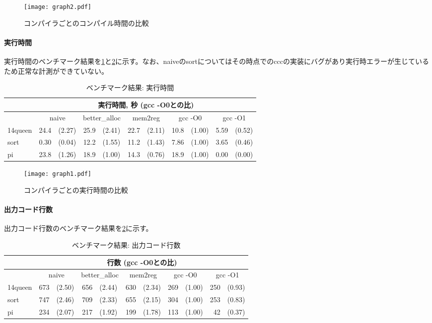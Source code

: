 \documentclass[../main.tex]{subfiles}
\begin{document}
\begin{figure}[h]
  \centering
  \texttt{[image: graph2.pdf]}
  \caption{コンパイラごとのコンパイル時間の比較}
  \label{ccc_bench_compile_graph}
\end{figure}

\clearpage
\paragraph{実行時間}

実行時間のベンチマーク結果を\cref{ccc_bench_run}と\cref{ccc_bench_run_graph}に示す。なお、naiveのsortについてはその時点でのcccの実装にバグがあり実行時エラーが生じているため正常な計測ができていない。

\begin{table}[h]
  \centering
  \begin{tabular}{l|rl|rl|rl|rl|rl}
    &\multicolumn{10}{c}{実行時間, 秒 (gcc -O0との比)} \\ \hline
    &\multicolumn{2}{c|}{naive}&\multicolumn{2}{c|}{better\_alloc}&\multicolumn{2}{c|}{mem2reg}&\multicolumn{2}{c|}{gcc -O0}&\multicolumn{2}{c}{gcc -O1} \\ \hline\hline
    14queen&24.4&(2.27)&25.9&(2.41)&22.7&(2.11)&10.8&(1.00)&5.59&(0.52) \\
    sort&0.30&(0.04)&12.2&(1.55)&11.2&(1.43)&7.86&(1.00)&3.65&(0.46) \\
    pi&23.8&(1.26)&18.9&(1.00)&14.3&(0.76)&18.9&(1.00)&0.00&(0.00) \\
  \end{tabular}
  \caption{ベンチマーク結果: 実行時間}
  \label{ccc_bench_run}
\end{table}

\begin{figure}[h]
  \centering
  \texttt{[image: graph1.pdf]}
  \caption{コンパイラごとの実行時間の比較}
  \label{ccc_bench_run_graph}
\end{figure}

\clearpage
\paragraph{出力コード行数}

出力コード行数のベンチマーク結果を\cref{ccc_bench_loc}に示す。

\begin{table}[h!]
  \centering
  \begin{tabular}{l|rl|rl|rl|rl|rl}
    &\multicolumn{10}{c}{行数 (gcc -O0との比)} \\ \hline
    &\multicolumn{2}{c|}{naive}&\multicolumn{2}{c|}{better\_alloc}&\multicolumn{2}{c|}{mem2reg}&\multicolumn{2}{c|}{gcc -O0}&\multicolumn{2}{c}{gcc -O1} \\ \hline\hline
    14queen&673&(2.50)&656&(2.44)&630&(2.34)&269&(1.00)&250&(0.93) \\
    sort&747&(2.46)&709&(2.33)&655&(2.15)&304&(1.00)&253&(0.83) \\
    pi&234&(2.07)&217&(1.92)&199&(1.78)&113&(1.00)&42&(0.37) \\
  \end{tabular}
  \caption{ベンチマーク結果: 出力コード行数}
  \label{ccc_bench_loc}
\end{table}
\end{document}
